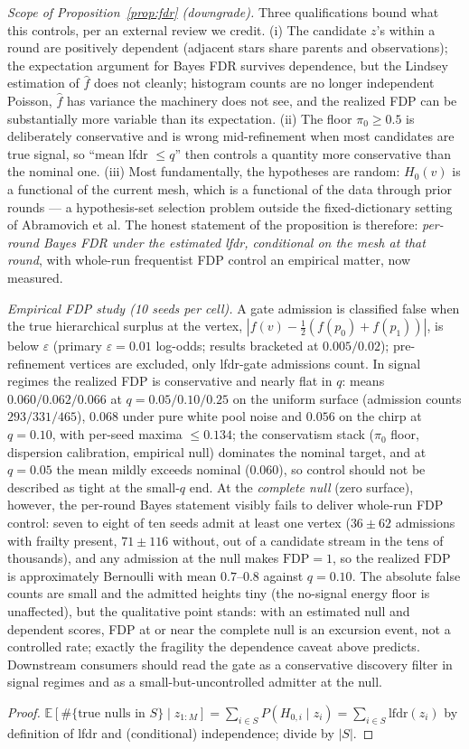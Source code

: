 \documentclass[11pt]{article}
\newcommand{\E}{\mathbb{E}}
\newcommand{\lfdr}{\mathrm{lfdr}}
\begin{document}
\emph{Scope of Proposition~\ref{prop:fdr} (downgrade).} Three qualifications
bound what this controls, per an external review we credit. (i) The candidate
$z$'s within a round are positively dependent (adjacent stars share parents
and observations); the expectation argument for Bayes FDR survives dependence,
but the Lindsey estimation of $\hat f$ does not cleanly; histogram counts
are no longer independent Poisson, $\hat f$ has variance the machinery does
not see, and the realized FDP can be substantially more variable than its
expectation. (ii) The floor $\pi_0\ge0.5$ is deliberately conservative and is
wrong mid-refinement when most candidates are true signal, so ``mean lfdr
$\le q$'' then controls a quantity more conservative than the nominal one.
(iii) Most fundamentally, the hypotheses are random: $H_0(v)$ is a functional
of the current mesh, which is a functional of the data through prior rounds
--- a hypothesis-set selection problem outside the fixed-dictionary setting of
Abramovich et al. The honest statement of the proposition is therefore:
\emph{per-round Bayes FDR under the estimated lfdr, conditional on the mesh at
that round}, with whole-run frequentist FDP control an empirical matter, now measured.

\emph{Empirical FDP study (10 seeds per cell).} A gate admission is classified
false when the true hierarchical surplus at the vertex,
$|f(v)-\tfrac12(f(p_0)+f(p_1))|$, is below $\varepsilon$ (primary
$\varepsilon=0.01$ log-odds; results bracketed at $0.005/0.02$);
pre-refinement vertices are excluded, only lfdr-gate admissions count. In
signal regimes the realized FDP is conservative and nearly flat in $q$:
means $0.060/0.062/0.066$ at $q=0.05/0.10/0.25$ on the uniform surface
(admission counts $293/331/465$), $0.068$ under pure white pool noise and
$0.056$ on the chirp at $q=0.10$, with per-seed maxima $\le0.134$; the
conservatism stack ($\pi_0$ floor, dispersion calibration, empirical null)
dominates the nominal target, and at $q=0.05$ the mean mildly exceeds nominal
($0.060$), so control should not be described as tight at the small-$q$ end.
At the \emph{complete null} (zero surface), however, the per-round Bayes
statement visibly fails to deliver whole-run FDP control: seven to eight of
ten seeds admit at least one vertex ($36\pm62$ admissions with frailty
present, $71\pm116$ without, out of a candidate stream in the tens of
thousands), and any admission at the null makes $\mathrm{FDP}=1$, so the
realized FDP is approximately Bernoulli with mean $0.7$--$0.8$ against
$q=0.10$. The absolute false counts are small and the admitted heights tiny
(the no-signal energy floor is unaffected), but the qualitative point stands:
with an estimated null and dependent scores, FDP at or near the complete null
is an excursion event, not a controlled rate; exactly the fragility the
dependence caveat above predicts. Downstream consumers should read the gate
as a conservative discovery filter in signal regimes and as a
small-but-uncontrolled admitter at the null.
\begin{proof}
$\E[\#\{\text{true nulls in }S\}\mid z_{1:M}]=\sum_{i\in S}P(H_{0,i}\mid z_i)
=\sum_{i\in S}\lfdr(z_i)$ by definition of lfdr and (conditional) independence; divide
by $|S|$.
\end{proof}
\end{document}
